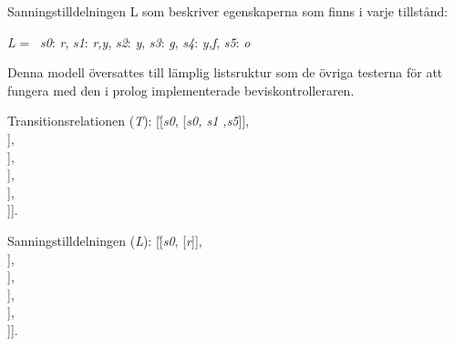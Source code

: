 Sanningstilldelningen L som beskriver egenskaperna som finns i varje tillstånd:
\begin{tabbing}
\textit{L} = \textbraceleft\
\textit{s0}:\textbraceleft
\textit{r}\textbraceright, 
\textit{s1}:\textbraceleft 
\textit{r,y}\textbraceright, 
\textit{s2}:\textbraceleft 
\textit{y}\textbraceright, 
\textit{s3}:\textbraceleft 
\textit{g}\textbraceright, 
\textit{s4}:\textbraceleft 
\textit{y,f}\textbraceright, 
\textit{s5}:\textbraceleft 
\textit{o}\textbraceright\ \textbraceright
\end{tabbing}

Denna modell översattes till lämplig listsruktur som de övriga testerna för att fungera med den i prolog implementerade beviskontrolleraren.
\begin{tabbing}
Transitionsrelationen (\textit{T}):
[\=[\textit{s0}, [\textit{s0, s1 ,s5}]],\\
\>[\textit{s1}, [\textit{s0, s3, s5}]],\\
\>[\textit{s2}, [\textit{s0, s1, s3, s5}]],\\
\>[\textit{s3}, [\textit{s3, s2, s5}]],\\
\>[\textit{s4}, [\textit{s4, s5}]],\\
\>[\textit{s5}, [\textit{s5, s0, s4, s5}]]].\\
\end{tabbing}

\begin{tabbing}
Sanningstilldelningen (\textit{L}):
[\=[\textit{s0}, [\textit{r}]],\\
\>[\textit{s1}, [\textit{r,y}]],\\
\>[\textit{s2}, [\textit{y}]],\\
\>[\textit{s3}, [\textit{g}]],\\
\>[\textit{s4}, [\textit{y,f}]],\\
\>[\textit{s5}, [\textit{o}]]].\\
\end{tabbing}
